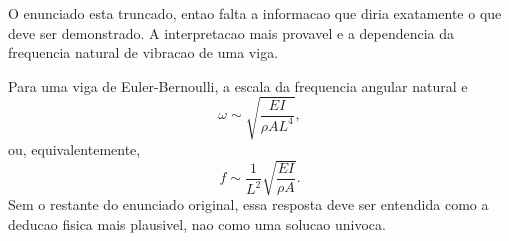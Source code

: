 O enunciado esta truncado, entao falta a informacao que diria exatamente o que deve ser demonstrado. A interpretacao mais provavel e a dependencia da frequencia natural de vibracao de uma viga.

Para uma viga de Euler-Bernoulli, a escala da frequencia angular natural e
\[
\omega \sim \sqrt{\frac{EI}{\rho A L^4}},
\]
ou, equivalentemente,
\[
f \sim \frac{1}{L^2}\sqrt{\frac{EI}{\rho A}}.
\]
Sem o restante do enunciado original, essa resposta deve ser entendida como a deducao fisica mais plausivel, nao como uma solucao univoca.


